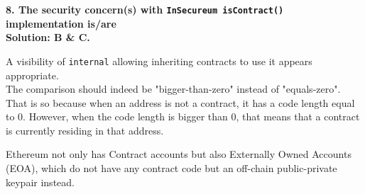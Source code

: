 \textbf{8. The security concern(s) with \texttt{InSecureum isContract()} implementation is/are}\label{sec:race5_q8}\\

\textbf{Solution: B \& C.}

A visibility of \verb|internal| allowing inheriting contracts to use it appears appropriate.\\

The comparison should indeed be "bigger-than-zero" instead of "equals-zero".
That is so because when an address is not a contract, it has a code length equal to 0.
However, when the code length is bigger than 0, that means that a contract is currently residing in that address.

Ethereum not only has Contract accounts but also Externally Owned Accounts (EOA), which do not have any contract code but an off-chain public-private keypair instead.\\